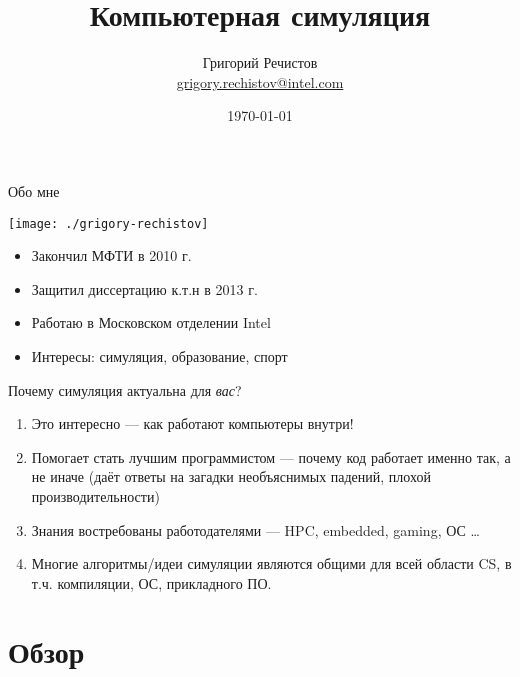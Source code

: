 \documentclass{beamer}
\title{Компьютерная симуляция }
\author[Григорий Речистов]{Григорий Речистов \\ \small{\href{mailto:grigory.rechistov@intel.com}{grigory.rechistov@intel.com}}}
\date{\today}
\begin{document}
\begin{frame}
\titlepage
\end{frame}

\begin{frame}
\tableofcontents
\end{frame} 

\begin{frame}{Обо мне}

\raggedleft \texttt{[image: ./grigory-rechistov]}

\begin{itemize}
\item Закончил МФТИ в 2010 г.
\item Защитил диссертацию к.т.н в 2013 г.
\item Работаю в Московском отделении Intel 
\item Интересы: симуляция, образование, спорт

\end{itemize}


\end{frame} 

\begin{frame}{Почему симуляция актуальна для \emph{вас}?}

\begin{enumerate}
\item Это интересно --- как работают компьютеры внутри!
\item Помогает стать лучшим программистом --- почему код работает именно так, а не иначе (даёт ответы на загадки необъяснимых падений, плохой производительности)
\item Знания востребованы работодателями --- HPC, embedded, gaming, ОС \dots
\item Многие алгоритмы/идеи симуляции являются общими для всей области CS, в т.ч. компиляции, ОС, прикладного ПО.
\end{enumerate}

\end{frame} 


\section{Обзор}
\end{document}
